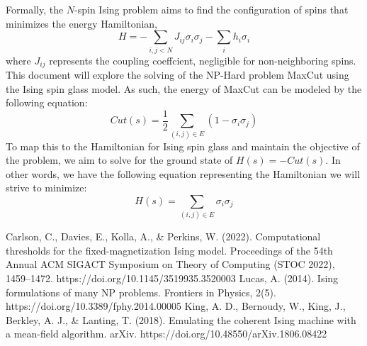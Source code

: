 \documentclass[conference]{IEEEtran}
\begin{document}
Formally, the $N$-spin Ising problem aims to find the configuration of spins that minimizes the energy Hamiltonian, 
\begin{equation}
H = -\sum_{i,j<N}J_{ij}\sigma_i\sigma_j - \sum_ih_i\sigma_i
\end{equation}
where $J_{ij}$ represents the coupling coeffcient, negligible for non-neighboring spins. This document will explore the solving of the NP-Hard problem MaxCut using the Ising spin glass model. As such, the energy of MaxCut can be modeled by the following equation:
\begin{equation}
Cut(s) = \frac{1}{2}\sum_{(i,j)\in E}(1-\sigma_i\sigma_j)
\end{equation}
To map this to the Hamiltonian for Ising spin glass and maintain the objective of the problem, we aim to solve for the ground state of $H(s) = -Cut(s)$. In other words, we have the following equation representing the Hamiltonian we will strive to minimize:
\begin{equation}
H(s) = \sum_{(i,j)\in E}\sigma_i\sigma_j
\end{equation}





\begin{thebibliography}{00}
 Carlson, C., Davies, E., Kolla, A., \& Perkins, W. (2022). Computational thresholds for the fixed-magnetization Ising model. Proceedings of the 54th Annual ACM SIGACT Symposium on Theory of Computing (STOC 2022), 1459–1472. https://doi.org/10.1145/3519935.3520003
 Lucas, A. (2014). Ising formulations of many NP problems. Frontiers in Physics, 2(5). https://doi.org/10.3389/fphy.2014.00005
 King, A. D., Bernoudy, W., King, J., Berkley, A. J., \& Lanting, T. (2018). Emulating the coherent Ising machine with a mean-field algorithm. arXiv. https://doi.org/10.48550/arXiv.1806.08422



\end{thebibliography}
\end{document}
